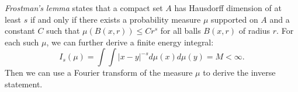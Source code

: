 \documentclass[12pt]{article}
\begin{document}
{\it Frostman's lemma} states that a compact set $A$ has Hausdorff dimension
of at least $s$ if and only if there exists a probability measure $\mu$
supported on $A$ and a constant $C$ such that $\mu(B(x,r)) \leq Cr^s$ for all
balls $B(x,r)$ of radius $r$.
For each such $\mu$, we can further derive a finite energy integral:
$$
I_s(\mu) = \int \int |x-y|^{-s} d\mu(x) d\mu(y) = M < \infty.
$$
Then we can use a Fourier transform of the measure $\mu$ to derive the inverse
statement.
\end{document}
